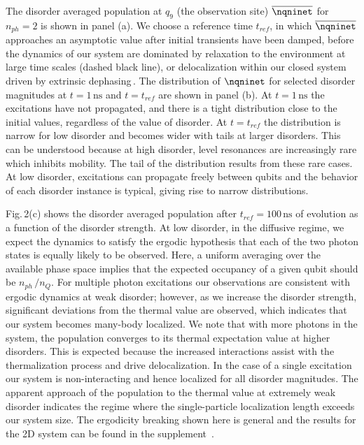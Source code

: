 The disorder averaged population at $q_9$ (the observation site) $\overline{ \nqninet }$ for $n_{ph}=2$ is shown in panel (a). We choose a reference time $t_{ref}$, in which $\overline{ \nqninet }$ approaches an asymptotic value after initial transients have been damped, before the dynamics of our system are dominated by relaxation to the environment at large time scales (dashed black line), or delocalization within our closed system driven by extrinsic dephasing\,\cite{supplement,Znidaric2015, Levi2016, Fischer2016, Luschen2017, vanNieuwenburg2017}. The distribution of $\nqninet$ for selected disorder magnitudes at $t=1\,\text{ns}$ and $t=t_{ref}$ are shown in panel (b). At $t=1\,\text{ns}$ the excitations have not propagated, and there is a tight distribution close to the initial values, regardless of the value of disorder. At $t=t_{ref}$ the distribution is narrow for low disorder and becomes wider with tails at larger disorders. This can be understood because at high disorder, level resonances are increasingly rare which inhibits mobility. The tail of the distribution results from these rare cases. At low disorder, excitations can propagate freely between qubits and the behavior of each disorder instance is typical, giving rise to narrow distributions.


Fig.\,2(c) shows the disorder averaged population after $t_{ref}=100\, \text{ns}$ of evolution as a function of the disorder strength. At low disorder, in the diffusive regime, we expect the dynamics to satisfy the ergodic hypothesis that each of the two photon states is equally likely to be observed. Here, a uniform averaging over the available phase space implies that the expected occupancy of a given qubit should be $n_{ph}\,/n_Q$. For multiple photon excitations our observations are consistent with ergodic dynamics at weak disorder; however, as we increase the disorder strength, significant deviations from the thermal value are observed, which indicates that our system becomes many-body localized. We note that with more photons in the system, the population converges to its thermal expectation value at higher disorders. This is expected because the increased interactions assist with the thermalization process and drive delocalization. In the case of a single excitation our system is non-interacting and hence localized for all disorder magnitudes. The apparent approach of the population to the thermal value at extremely weak disorder indicates the regime where the single-particle localization length exceeds our system size.  The ergodicity breaking shown here is general and the results for the 2D system can be found in the supplement\, \cite{supplement}.
